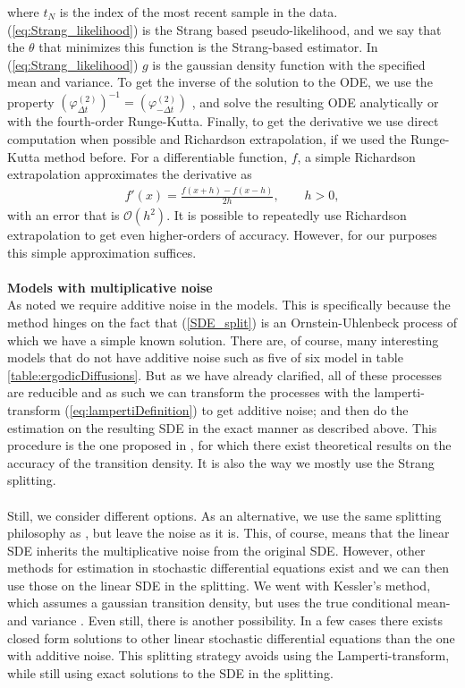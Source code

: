 where $t_N$ is the index of the most recent sample in the data. (\ref{eq:Strang_likelihood}) is the Strang based pseudo-likelihood, and we say that the $\theta$ that minimizes this function is the Strang-based estimator. In (\ref{eq:Strang_likelihood}) $g$ is the gaussian density function with the specified mean and variance. 
To get the inverse of the solution to the ODE, we use the property $\left(\varphi_{\Delta t}^{(2)}\right)^{-1} = \left(\varphi_{-\Delta t}^{(2)}\right)$ \cite[Remark below equation (9)]{SplittingSchemes}, and solve the resulting ODE analytically or with the fourth-order Runge-Kutta. Finally, to get the derivative we use direct computation when possible and Richardson extrapolation, if we used the Runge-Kutta method before. For a differentiable function, $f$, a simple Richardson extrapolation approximates the derivative as
\begin{align}
    f'(x) = \frac{f(x + h) - f(x - h)}{2h}, \qquad h > 0,
\end{align}
with an error that is $\mathcal{O}(h^2)$. It is possible to repeatedly use Richardson extrapolation to get even higher-orders of accuracy. However, for our purposes this simple approximation suffices.
\\\\
\textbf{Models with multiplicative noise}\\
As noted we require additive noise in the models. This is specifically because the method hinges on the fact that (\ref{SDE_split}) is an Ornstein-Uhlenbeck process of which we have a simple known solution. There are, of course, many interesting models that do not have additive noise such as five of six model in table \ref{table:ergodicDiffusions}. But as we have already clarified, all of these processes are reducible and as such we can transform the processes with the lamperti-transform (\ref{eq:lampertiDefinition}) to get additive noise; and then do the estimation on the resulting SDE in the exact manner as described above. This procedure is the one proposed in \cite{SplittingSchemes}, for which there exist theoretical results on the accuracy of the transition density. It is also the way we mostly use the Strang splitting.\\\\
Still, we consider different options. As an alternative, we use the same splitting philosophy as \cite{SplittingSchemes}, but leave the noise as it is. This, of course, means that the linear SDE inherits the multiplicative noise from the original SDE. However, other methods for estimation in stochastic differential equations exist and we can then use those on the linear SDE in the splitting. We went with Kessler's method, which assumes a gaussian transition density, but uses the true conditional mean- and variance \cite[equation (1.7)]{Kessler1997}. Even still, there is another possibility. In a few cases there exists closed form solutions to other linear stochastic differential equations than the one with additive noise. This splitting strategy avoids using the Lamperti-transform, while still using exact solutions to the SDE in the splitting. \\\\
